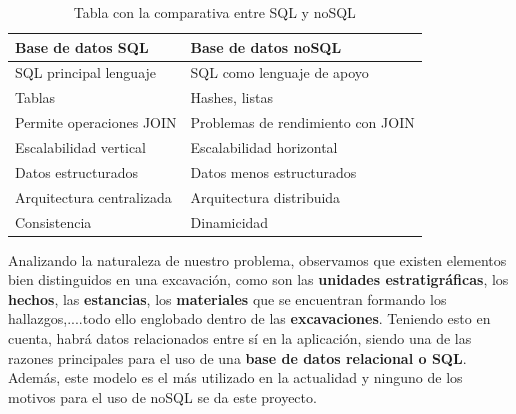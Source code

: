     \begin{table}[H]
        \begin{center}
            \begin{tabular}{ |l|l| } \hline
                \textbf{Base de datos SQL} & \textbf{Base de datos noSQL} \\ \hline
                SQL principal lenguaje & SQL como lenguaje de apoyo \\
                Tablas & Hashes, listas \\
                Permite operaciones JOIN & Problemas de rendimiento con JOIN \\
                Escalabilidad vertical & Escalabilidad horizontal \\
                Datos estructurados & Datos menos estructurados \\ 
                Arquitectura centralizada & Arquitectura distribuida \\
                Consistencia & Dinamicidad \\ \hline
            \end{tabular}
            \caption{Tabla con la comparativa entre SQL y noSQL}
            \label{tab:databases}
        \end{center}
    \end{table}

Analizando la naturaleza de nuestro problema, observamos que existen elementos bien
distinguidos en una excavación, como son las \textbf{unidades estratigráficas}, los 
\textbf{hechos}, las \textbf{estancias}, los \textbf{materiales} que se encuentran formando
los hallazgos,....todo ello englobado dentro de las \textbf{excavaciones}. Teniendo esto en
cuenta, habrá datos relacionados entre sí en la aplicación, siendo una de las razones
principales para el uso de una \textbf{base de datos relacional o SQL}. Además, este modelo
es el más utilizado en la actualidad y ninguno de los motivos para el uso de noSQL se da
este proyecto.
